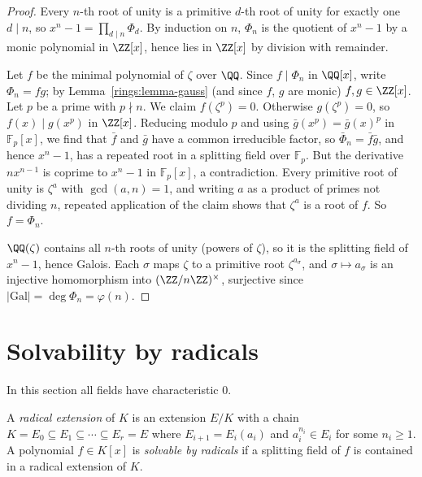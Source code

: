 \begin{proof}
Every $n$-th root of unity is a primitive $d$-th root of unity for exactly one $d \mid n$, so
$x^n - 1 = \prod_{d \mid n}\Phi_d$. By induction on $n$, $\Phi_n$ is the quotient of $x^n - 1$ by a
monic polynomial in $\ZZ[x]$, hence lies in $\ZZ[x]$ by division with remainder.

Let $f$ be the minimal polynomial of $\zeta$ over $\QQ$. Since $f \mid \Phi_n$ in $\QQ[x]$, write
$\Phi_n = fg$; by Lemma~\ref{rings:lemma-gauss} (and since $f$, $g$ are monic) $f, g \in \ZZ[x]$. Let $p$
be a prime with $p \nmid n$. We claim $f(\zeta^p) = 0$. Otherwise $g(\zeta^p) = 0$, so $f(x) \mid g(x^p)$ in
$\ZZ[x]$. Reducing modulo $p$ and using $\bar g(x^p) = \bar g(x)^p$ in $\mathbb{F}_p[x]$, we find that $\bar f$
and $\bar g$ have a common irreducible factor, so $\bar\Phi_n = \bar f \bar g$, and hence $x^n - 1$, has a
repeated root in a splitting field over $\mathbb{F}_p$. But the derivative $nx^{n-1}$ is coprime to
$x^n - 1$ in $\mathbb{F}_p[x]$, a contradiction. Every primitive root of unity is $\zeta^a$ with
$\gcd(a, n) = 1$, and writing $a$ as a product of primes not dividing $n$, repeated
application of the claim shows that $\zeta^a$ is a root of $f$. So $f = \Phi_n$.

$\QQ(\zeta)$ contains all $n$-th roots of unity (powers of $\zeta$), so it is the splitting field of
$x^n - 1$, hence Galois. Each $\sigma$ maps $\zeta$ to a primitive root $\zeta^{a_\sigma}$, and
$\sigma \mapsto a_\sigma$ is an injective homomorphism into $(\ZZ/n\ZZ)^\times$, surjective since
$|\mathrm{Gal}| = \deg\Phi_n = \varphi(n)$.
\end{proof}

\section{Solvability by radicals}\label{fields:section-radicals}

In this section all fields have characteristic $0$.

\begin{definition}\label{fields:definition-radical}
A \emph{radical extension} of $K$ is an extension $E/K$ with a chain
$K = E_0 \subseteq E_1 \subseteq \cdots \subseteq E_r = E$ where $E_{i+1} = E_i(a_i)$ and $a_i^{n_i} \in E_i$ for some
$n_i \geq 1$. A polynomial $f \in K[x]$ is \emph{solvable by radicals} if a splitting field of $f$ is
contained in a radical extension of $K$.
\end{definition}

